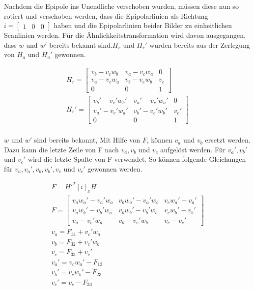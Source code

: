 Nachdem die Epipole ins Unendliche verschoben wurden, müssen diese nun so rotiert und verschoben werden, dass die Epipolarlinien als Richtung $i = \begin{bmatrix}1&0&0\end{bmatrix}$ haben und die Epipolarlinien beider Bilder zu einheitlichen Scanlinien werden. Für die Ähnlichkeitstransformation wird davon ausgegangen, dass $w$ und $w'$ bereits bekannt sind.$H_r$ und $H_r'$ wurden bereits aus der Zerlegung von $H_a$ und $H_a'$ gewonnen.

\begin{gather}
	H_r = 
	\begin{bmatrix}
		v_b-v_cw_b&	v_a-v_cw_a&0\\
		v_a-v_cw_a&v_b-v_cw_b&v_c\\
		0&0&1
	\end{bmatrix}\\
	H_r' = 
	\begin{bmatrix}
		v_b'-v_c'w_b'&	v_a'-v_c'w_a'&0\\
		v_a'-v_c'w_a'&v_b'-v_c'w_b'&v_c'\\
		0&0&1
	\end{bmatrix}\\
\end{gather}

$w$ und $w'$ sind bereits bekannt, Mit Hilfe von $F$, können $v_a$ und $v_b$ ersetzt werden. Dazu kann die letzte Zeile von F nach $v_a, v_b$ und $v_c$ aufgelöst werden. Für $v_a', v_b'$ und $v_c'$ wird die letzte Spalte von F verwendet. So können folgende Gleichungen für $v_a, v_a',v_b, v_b', v_c$ und $v_c'$ gewonnen werden. 

\begin{gather}
	F = H'^T[i]_xH\\
	F=
	\begin{bmatrix}
		v_aw_a' - v_a'w_a&v_bw_a' - v_a'w_b&v_cw_a' - v_a'\\
		v_aw_b' - v_b'w_a&v_bw_b' - v_b'w_b&v_cw_b' - v_b'\\
		v_a - v_c'w_a&v_b - v_c'w_b&v_c-v_c'
	\end{bmatrix}\\
	v_a = F_{31}+v_c'w_a\\
	v_b = F_{32}+v_c'w_b\\
	v_c = F_{33}+v_c'\\
	v_a' = v_cw_a'-F_{13}\\
	v_b' = v_cw_b'-F_{23}\\
	v_c' = v_c -F_{33}
\end{gather}

